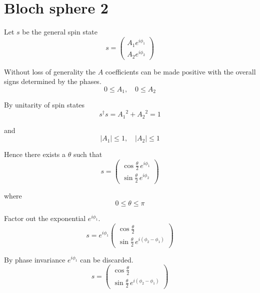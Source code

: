 

\section*{Bloch sphere 2}

Let $s$ be the general spin state
\begin{equation*}
s=\begin{pmatrix}
A_1e^{i\phi_1}
\\
A_2e^{i\phi_2}
\end{pmatrix}
\end{equation*}

Without loss of generality the $A$ coefficients can be made positive
with the overall signs determined by the phases.
\begin{equation*}
0\le A_1,\quad 0\le A_2
\end{equation*}

By unitarity of spin states
\begin{equation*}
s^\dagger s={A_1}^2+{A_2}^2=1
\end{equation*}

and
\begin{equation*}
|A_1|\le1,\quad|A_2|\le1
\end{equation*}

Hence there exists a $\theta$ such that
\begin{equation*}
s=\begin{pmatrix}
\cos\frac{\theta}{2}\,e^{i\phi_1}
\\[1ex]
\sin\frac{\theta}{2}\,e^{i\phi_2}
\end{pmatrix}
\end{equation*}

where
\begin{equation*}
0\le\theta\le\pi
\end{equation*}

Factor out the exponential $e^{i\phi_1}$.
\begin{equation*}
s=e^{i\phi_1}\begin{pmatrix}
\cos\frac{\theta}{2}
\\[1ex]
\sin\frac{\theta}{2}\,e^{i(\phi_2-\phi_1)}
\end{pmatrix}
\end{equation*}

By phase invariance $e^{i\phi_1}$ can be discarded.
\begin{equation*}
s=\begin{pmatrix}
\cos\frac{\theta}{2}
\\[1ex]
\sin\frac{\theta}{2}\,e^{i(\phi_2-\phi_1)}
\end{pmatrix}
\end{equation*}

